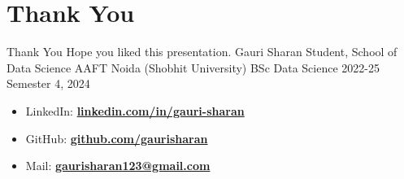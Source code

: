 \documentclass[aspectratio=169, hideothersubsections]{beamer}
\begin{document}
\section{Thank You}
\begin{frame}{Thank You}
Hope you liked this presentation. \newline \newline
\alert{Gauri Sharan} \newline
Student, School of Data Science \newline
AAFT Noida (Shobhit University) \newline
BSc Data Science 2022-25 \newline
Semester 4, 2024 \newline
\begin{itemize}
    \item LinkedIn: \href{https://www.linkedin.com/in/gauri-sharan}{\bf linkedin.com/in/gauri-sharan} 
    \item GitHub: \href{https://github.com/gaurisharan}{\bf github.com/gaurisharan}
    \item Mail: \href{mailto:gaurisharan123@gmail.com}{\bf gaurisharan123@gmail.com}
\end{itemize}
\end{frame}
\end{document}
